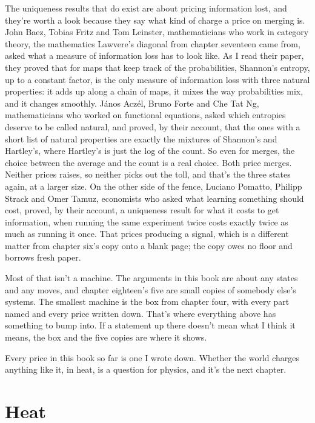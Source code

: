 \documentclass[11pt,twoside]{article}
\theoremstyle{thielethm}
\theoremstyle{thieledef}
\theoremstyle{thieledef}
\theoremstyle{thieledef}
\theoremstyle{thielethm}
\theoremstyle{thieleobs}
\theoremstyle{thielethm}
\begin{document}
The uniqueness results that do exist are about pricing information lost, and they're worth a look because they say what kind of charge a price on merging is. John Baez, Tobias Fritz and Tom Leinster, mathematicians who work in category theory, the mathematics Lawvere's diagonal from chapter seventeen came from, asked what a measure of information loss has to look like. As I read their paper, they proved that for maps that keep track of the probabilities, Shannon's entropy, up to a constant factor, is the only measure of information loss with three natural properties: it adds up along a chain of maps, it mixes the way probabilities mix, and it changes smoothly. János Aczél, Bruno Forte and Che Tat Ng, mathematicians who worked on functional equations, asked which entropies deserve to be called natural, and proved, by their account, that the ones with a short list of natural properties are exactly the mixtures of Shannon's and Hartley's, where Hartley's is just the log of the count. So even for merges, the choice between the average and the count is a real choice. Both price merges. Neither prices raises, so neither picks out the toll, and that's the three states again, at a larger size. On the other side of the fence, Luciano Pomatto, Philipp Strack and Omer Tamuz, economists who asked what learning something should cost, proved, by their account, a uniqueness result for what it costs to get information, when running the same experiment twice costs exactly twice as much as running it once. That prices producing a signal, which is a different matter from chapter six's copy onto a blank page; the copy owes no floor and borrows fresh paper.

Most of that isn't a machine. The arguments in this book are about any states and any moves, and chapter eighteen's five are small copies of somebody else's systems. The smallest machine is the box from chapter four, with every part named and every price written down. That's where everything above has something to bump into. If a statement up there doesn't mean what I think it means, the box and the five copies are where it shows.

Every price in this book so far is one I wrote down. Whether the world charges anything like it, in heat, is a question for physics, and it's the next chapter.

\section{Heat}
\label{sec:heat}
\end{document}

